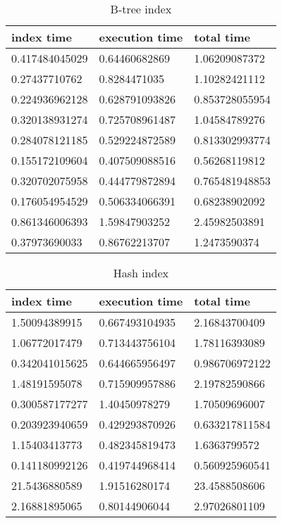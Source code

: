 \begin{itemize*}
\begin{table}[H]
\begin{center}
\begin{tabular}{|l|l|l|}
\hline
index time & execution time & total time                \\ \hline
0.417484045029 & 0.64460682869  & 1.06209087372  \\ \hline
0.27437710762  & 0.8284471035   & 1.10282421112  \\ \hline
0.224936962128 & 0.628791093826 & 0.853728055954 \\ \hline
0.320138931274 & 0.725708961487 & 1.04584789276  \\ \hline
0.284078121185 & 0.529224872589 & 0.813302993774 \\ \hline
0.155172109604 & 0.407509088516 & 0.56268119812  \\ \hline
0.320702075958 & 0.444779872894 & 0.765481948853 \\ \hline
0.176054954529 & 0.506334066391 & 0.68238902092  \\ \hline
0.861346006393 & 1.59847903252  & 2.45982503891  \\ \hline
0.37973690033  & 0.86762213707  & 1.2473590374  \\ \hline
\end{tabular}
\end{center}
\caption{B-tree index}
\end{table}

\begin{table}[H]
\begin{center}
\begin{tabular}{|l|l|l|}
\hline
index time & execution time & total time     \\ \hline
1.50094389915  & 0.667493104935 & 2.16843700409  \\ \hline
1.06772017479  & 0.713443756104 & 1.78116393089  \\ \hline
0.342041015625 & 0.644665956497 & 0.986706972122 \\ \hline
1.48191595078  & 0.715909957886 & 2.19782590866  \\ \hline
0.300587177277 & 1.40450978279  & 1.70509696007  \\ \hline
0.203923940659 & 0.429293870926 & 0.633217811584 \\ \hline
1.15403413773  & 0.482345819473 & 1.6363799572   \\ \hline
0.141180992126 & 0.419744968414 & 0.560925960541 \\ \hline
21.5436880589  & 1.91516280174  & 23.4588508606  \\ \hline
2.16881895065  & 0.80144906044  & 2.97026801109 \\ \hline
\end{tabular}
\end{center}
\caption{Hash index}
\end{table}


\end{itemize*}
